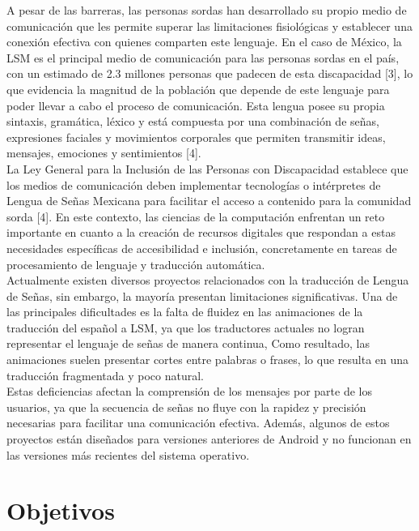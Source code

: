 A pesar de las barreras, las personas sordas han desarrollado su propio medio de comunicación que les permite superar las limitaciones fisiológicas y establecer una conexión efectiva con quienes comparten este lenguaje. En el caso de México, la LSM es el principal medio de comunicación para las personas sordas en el país, con un estimado de 2.3 millones personas que padecen de esta discapacidad [3], lo que evidencia la magnitud de la población que depende de este lenguaje para poder llevar a cabo el proceso de comunicación. Esta lengua posee su propia sintaxis, gramática, léxico y está compuesta por una combinación de señas, expresiones faciales y movimientos corporales que permiten transmitir ideas, mensajes, emociones y sentimientos [4].\\

La Ley General para la Inclusión de las Personas con Discapacidad establece que los medios de comunicación deben implementar tecnologías o intérpretes de Lengua de Señas Mexicana para facilitar el acceso a contenido para la comunidad sorda [4]. En este contexto, las ciencias de la computación enfrentan un reto importante en cuanto a la creación de recursos digitales que respondan a estas necesidades específicas de accesibilidad e inclusión, concretamente en tareas de procesamiento de lenguaje y traducción automática.\\

Actualmente existen diversos proyectos relacionados con la traducción de Lengua de Señas, sin embargo, la mayoría presentan limitaciones significativas. Una de las principales dificultades es la falta de fluidez en las animaciones de la traducción del español a LSM, ya que los traductores actuales no logran representar el lenguaje de señas de manera continua, Como resultado, las animaciones suelen presentar cortes entre palabras o frases, lo que resulta en una traducción fragmentada y poco natural.\\

Estas deficiencias afectan la comprensión de los mensajes por parte de los usuarios, ya que la secuencia de señas no fluye con la rapidez y precisión necesarias para facilitar una comunicación efectiva. Además, algunos de estos proyectos están diseñados para versiones anteriores de Android y no funcionan en las versiones más recientes del sistema operativo.\\


\section{Objetivos}
